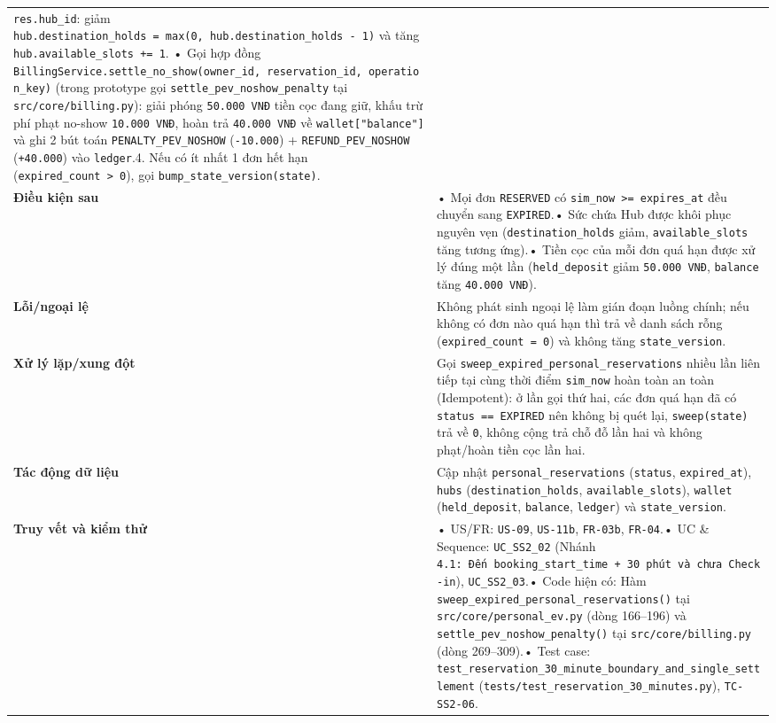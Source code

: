 \documentclass[11pt,a4paper]{article}
\begin{document}
\begin{longtable}[]{@{}
  >{\raggedright\arraybackslash}p{}
  >{\raggedright\arraybackslash}p{}@{}}
\texttt{res.hub\_id}: giảm
\texttt{hub.destination\_holds\ =\ max(0,\ hub.destination\_holds\ -\ 1)}
và tăng \texttt{hub.available\_slots\ +=\ 1}. • Gọi hợp đồng
\texttt{BillingService.settle\_no\_show(owner\_id,\ reservation\_id,\ operation\_key)}
(trong prototype gọi \texttt{settle\_pev\_noshow\_penalty} tại
\texttt{src/core/billing.py}): giải phóng \texttt{50.000\ VNĐ} tiền cọc
đang giữ, khấu trừ phí phạt no-show \texttt{10.000\ VNĐ}, hoàn trả
\texttt{40.000\ VNĐ} về \texttt{wallet{[}"balance"{]}} và ghi 2 bút toán
\texttt{PENALTY\_PEV\_NOSHOW} (\texttt{-10.000}) +
\texttt{REFUND\_PEV\_NOSHOW} (\texttt{+40.000}) vào \texttt{ledger}.4.
Nếu có ít nhất 1 đơn hết hạn
(\texttt{expired\_count\ \textgreater{}\ 0}), gọi
\texttt{bump\_state\_version(state)}. \\
\textbf{Điều kiện sau} & • Mọi đơn \texttt{RESERVED} có
\texttt{sim\_now\ \textgreater{}=\ expires\_at} đều chuyển sang
\texttt{EXPIRED}.• Sức chứa Hub được khôi phục nguyên vẹn
(\texttt{destination\_holds} giảm, \texttt{available\_slots} tăng tương
ứng).• Tiền cọc của mỗi đơn quá hạn được xử lý đúng một lần
(\texttt{held\_deposit} giảm \texttt{50.000\ VNĐ}, \texttt{balance} tăng
\texttt{40.000\ VNĐ}). \\
\textbf{Lỗi/ngoại lệ} & Không phát sinh ngoại lệ làm gián đoạn luồng
chính; nếu không có đơn nào quá hạn thì trả về danh sách rỗng
(\texttt{expired\_count\ =\ 0}) và không tăng
\texttt{state\_version}. \\
\textbf{Xử lý lặp/xung đột} & Gọi
\texttt{sweep\_expired\_personal\_reservations} nhiều lần liên tiếp tại
cùng thời điểm \texttt{sim\_now} hoàn toàn an toàn (Idempotent): ở lần
gọi thứ hai, các đơn quá hạn đã có \texttt{status\ ==\ EXPIRED} nên
không bị quét lại, \texttt{sweep(state)} trả về \texttt{0}, không cộng
trả chỗ đỗ lần hai và không phạt/hoàn tiền cọc lần hai. \\
\textbf{Tác động dữ liệu} & Cập nhật \texttt{personal\_reservations}
(\texttt{status}, \texttt{expired\_at}), \texttt{hubs}
(\texttt{destination\_holds}, \texttt{available\_slots}),
\texttt{wallet} (\texttt{held\_deposit}, \texttt{balance},
\texttt{ledger}) và \texttt{state\_version}. \\
\textbf{Truy vết và kiểm thử} & • US/FR: \texttt{US-09},
\texttt{US-11b}, \texttt{FR-03b}, \texttt{FR-04}.• UC \& Sequence:
\texttt{UC\_SS2\_02} (Nhánh
\texttt{4.1:\ Đến\ booking\_start\_time\ +\ 30\ phút\ và\ chưa\ Check-in}),
\texttt{UC\_SS2\_03}.• Code hiện có: Hàm
\texttt{sweep\_expired\_personal\_reservations()} tại
\texttt{src/core/personal\_ev.py} (dòng 166--196) và
\texttt{settle\_pev\_noshow\_penalty()} tại \texttt{src/core/billing.py}
(dòng 269--309).• Test case:
\texttt{test\_reservation\_30\_minute\_boundary\_and\_single\_settlement}
(\texttt{tests/test\_reservation\_30\_minutes.py}),
\texttt{TC-SS2-06}. \\
\end{longtable}
\end{document}
